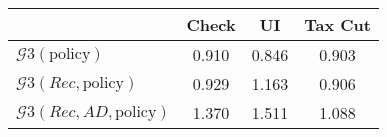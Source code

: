 \begin{tabular}{@{}lccc@{}} 
\toprule 
                          & Check      & UI    & Tax Cut    \\  \midrule 
$\mathcal{G}3(\text{policy})$ & 0.910  & 0.846  & 0.903     \\ 
$\mathcal{G}3(Rec,\text{policy})$ & 0.929  & 1.163  & 0.906     \\ 
$\mathcal{G}3(Rec, AD,\text{policy})$ & 1.370  & 1.511  & 1.088     \\ 
\end{tabular}  
